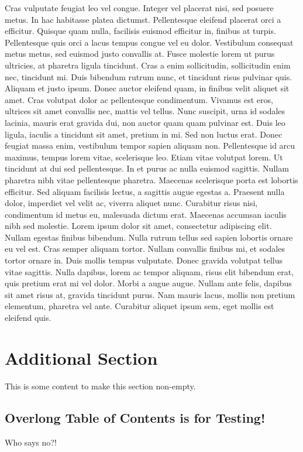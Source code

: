 {Cras vulputate feugiat leo vel congue. Integer vel placerat nisi, sed posuere metus. In hac habitasse platea dictumst. Pellentesque eleifend placerat orci a efficitur. Quisque quam nulla, facilisis euismod efficitur in, finibus at turpis. Pellentesque quis orci a lacus tempus congue vel eu dolor. Vestibulum consequat metus metus, sed euismod justo convallis at. Fusce molestie lorem ut purus ultricies, at pharetra ligula tincidunt. Cras a enim sollicitudin, sollicitudin enim nec, tincidunt mi. Duis bibendum rutrum nunc, et tincidunt risus pulvinar quis. Aliquam et justo ipsum. Donec auctor eleifend quam, in finibus velit aliquet sit amet. Cras volutpat dolor ac pellentesque condimentum. Vivamus est eros, ultrices sit amet convallis nec, mattis vel tellus. Nunc suscipit, urna id sodales lacinia, mauris erat gravida dui, non auctor quam quam pulvinar est. Duis leo ligula, iaculis a tincidunt sit amet, pretium in mi.
Sed non luctus erat. Donec feugiat massa enim, vestibulum tempor sapien aliquam non. Pellentesque id arcu maximus, tempus lorem vitae, scelerisque leo. Etiam vitae volutpat lorem. Ut tincidunt at dui sed pellentesque. In et purus ac nulla euismod sagittis. Nullam pharetra nibh vitae pellentesque pharetra. Maecenas scelerisque porta est lobortis efficitur. Sed aliquam facilisis lectus, a sagittis augue egestas a. Praesent nulla dolor, imperdiet vel velit ac, viverra aliquet nunc. Curabitur risus nisi, condimentum id metus eu, malesuada dictum erat. Maecenas accumsan iaculis nibh sed molestie. Lorem ipsum dolor sit amet, consectetur adipiscing elit. Nullam egestas finibus bibendum. Nulla rutrum tellus sed sapien lobortis ornare eu vel est.
Cras semper aliquam tortor. Nullam convallis finibus mi, et sodales tortor ornare in. Duis mollis tempus vulputate. Donec gravida volutpat tellus vitae sagittis. Nulla dapibus, lorem ac tempor aliquam, risus elit bibendum erat, quis pretium erat mi vel dolor. Morbi a augue augue. Nullam ante felis, dapibus sit amet risus at, gravida tincidunt purus. Nam mauris lacus, mollis non pretium elementum, pharetra vel ante. Curabitur aliquet ipsum sem, eget mollis est eleifend quis.}

\long\def\myrepeat#1\relax{#1\relax#1\relax}

\myrepeat\myrepeat\myrepeat\myrepeat\myrepeat
{}
\section{Additional Section }
This is some content to make this section non-empty.
\relax

\let\myrepeat\relax
\let\mysection\relax

\subsection{Overlong Table of Contents is for Testing!}

Who says no?!

